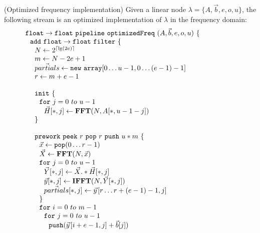 \begin{transformation} (Optimized frequency implementation)
Given a linear node $\lambda = \{A, {\vec b}, e, o, u\}$, the
following stream is an optimized implementation of $\lambda$ in the
frequency domain: \\
\begin{equation} \nonumber
  \begin{array}{ll}

    {\tt float \rightarrow float}~{\tt pipeline~optimizedFreq~}(A, {\vec b}, e, o, u){\tt ~\{} & \hspace{40pt}\\
    ~~{\tt add~float \rightarrow float~filter~\{}\\
    ~~~~N \leftarrow 2^{\lceil \lg(2e) \rceil} \\
    ~~~~m \leftarrow N-2e+1 \\
    ~~~~\vec{partials} \leftarrow {\tt new~array}[0\dots u-1,0 \dots (e-1)-1] \\
    ~~~~r \leftarrow m+e-1 \\
    \\
    ~~~~{\tt init}~{\tt \{} \\
    ~~~~~~{\tt for}~j=0~to~u-1\\
    ~~~~~~~~\vec{H}[*,j] \leftarrow \mathbf{FFT}(N,A[*,u-1-j]) \\
    ~~~~{\tt \}} \\
    \\
    ~~~~{\tt prework}~{\tt peek}~r~{\tt pop}~r~{\tt push}~u*m~{\tt \{}\\
    ~~~~~~\vec{x} \leftarrow {\tt pop}(0 \dots r-1) \\
    ~~~~~~\vec{X} \leftarrow \mathbf{FFT} (N, \vec{x}) \\
    ~~~~~~{\tt for}~j=0~to~u-1\\
    ~~~~~~~~\vec{Y}[*,j] \leftarrow \vec{X} .* \vec{H}[*,j] \\
    ~~~~~~~~\vec{y}[*,j] \leftarrow \mathbf{IFFT}(N, \vec{Y}[*,j]) \\
    ~~~~~~~~\vec{partials}[*,j] \leftarrow \vec{y}\hspace{1pt}[r \dots r+(e-1)-1,j] \\
    ~~~~~~{\tt \}} \\
    ~~~~~~{\tt for}~i=0~to~m-1\\
    ~~~~~~~~{\tt for}~j=0~to~u-1\\
    ~~~~~~~~~~{\tt push}(\vec{y}\hspace{1pt}[i+e-1,j] + \vec{b}[j]) \\

\end{array}
\end{equation}
\end{transformation}
